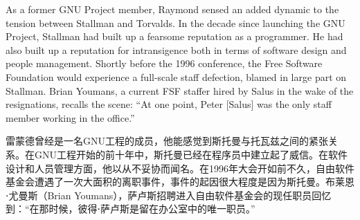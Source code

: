 \ifdefined\eng
As a former GNU Project member, Raymond sensed an added dynamic to the tension between Stallman and Torvalds. In the decade since launching the GNU Project, Stallman had built up a fearsome reputation as a programmer. He had also built up a reputation for intransigence both in terms of software design and people management. Shortly before the 1996 conference, the Free Software Foundation would experience a full-scale staff defection, blamed in large part on Stallman. Brian Youmans, a current FSF staffer hired by Salus in the wake of the resignations, recalls the scene: ``At one point, Peter [Salus] was the only staff member working in the office.''
\fi

\ifdefined\chs
雷蒙德曾经是一名GNU工程的成员，他能感觉到斯托曼与托瓦兹之间的紧张关系。在GNU工程开始的前十年中，斯托曼已经在程序员中建立起了威信。在软件设计和人员管理方面，他以从不妥协而闻名。在1996年大会开如前不久，自由软件基金会遭遇了一次大面积的离职事件，事件的起因很大程度是因为斯托曼。布莱恩⋅尤曼斯（Brian Youmans），萨卢斯招聘进入自由软件基金会的现任职员回忆到：``在那时候，彼得⋅萨卢斯是留在办公室中的唯一职员。''
\fi






